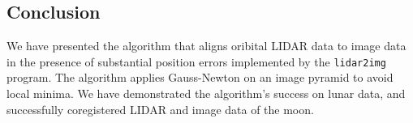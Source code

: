\documentclass[float=false, crop=false]{standalone}
\begin{document}
\subsection{Conclusion}
We have presented the algorithm that aligns oribital LIDAR data to image data
in the presence of substantial position errors implemented by the {\texttt{lidar2img}} program.
The algorithm applies Gauss-Newton
on an image pyramid to avoid local minima. We have demonstrated the algorithm's
success on lunar data, and successfully coregistered LIDAR and image data of the moon. 

%
%
\end{document}
